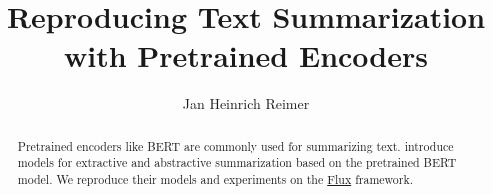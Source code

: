 \documentclass[english,sigconf,nonacm,natbib=false,balance=false,screen,review]{acmart}
\title{Reproducing Text Summarization with Pretrained Encoders}
\author{Jan Heinrich Reimer}
\affiliation{
    \institution{Martin Luther University Halle-Wittenberg}
    \streetaddress{Von-Seckendorff-Platz~1}
    \postcode{06108}
    \city{Halle (Saale)}
    \country{Germany}
}
\begin{document}
\begin{abstract}
    Pretrained encoders like BERT are commonly used for summarizing text. \citeauthor{DBLP:conf/emnlp/LiuL19} introduce models for extractive and abstractive summarization based on the pretrained BERT model.
    We reproduce their models and experiments on the \href{https://fluxml.ai/}{Flux} framework.
\end{abstract}

\maketitle

\printbibliography
\end{document}
